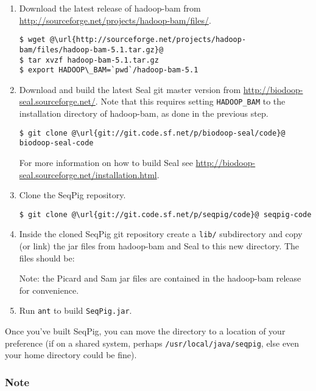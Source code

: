 \begin{enumerate}
\item Download the latest release of hadoop-bam from \url{http://sourceforge.net/projects/hadoop-bam/files/}.
\begin{lstlisting} 
$ wget @\url{http://sourceforge.net/projects/hadoop-bam/files/hadoop-bam-5.1.tar.gz}@
$ tar xvzf hadoop-bam-5.1.tar.gz
$ export HADOOP\_BAM=`pwd`/hadoop-bam-5.1
\end{lstlisting}
\item Download and build the latest Seal git master version from
 \url{http://biodoop-seal.sourceforge.net/}. Note that this requires setting
 {\tt HADOOP\_BAM} to the installation directory of hadoop-bam, as done in the previous step.
\begin{lstlisting} 
$ git clone @\url{git://git.code.sf.net/p/biodoop-seal/code}@ biodoop-seal-code
\end{lstlisting}
For more information on how to build Seal see \url{http://biodoop-seal.sourceforge.net/installation.html}.
\item Clone the SeqPig repository.
\begin{lstlisting} 
$ git clone @\url{git://git.code.sf.net/p/seqpig/code}@ seqpig-code
\end{lstlisting}
\item Inside the cloned SeqPig git repository create a
{\tt lib/} subdirectory and copy (or link) the jar files
from hadoop-bam and Seal to this new directory.  The files should be:
%
Note: the Picard and Sam jar files are contained in the hadoop-bam release
for convenience.
\item Run {\tt ant} to build {\tt SeqPig.jar}.
\end{enumerate}

Once you've built SeqPig, you can move the directory to a location of your
preference (if on a shared system, perhaps {\tt /usr/local/java/seqpig}, else
even your home directory could be fine).

\subsubsection{Note}
\label{sect:piggybank_note}

